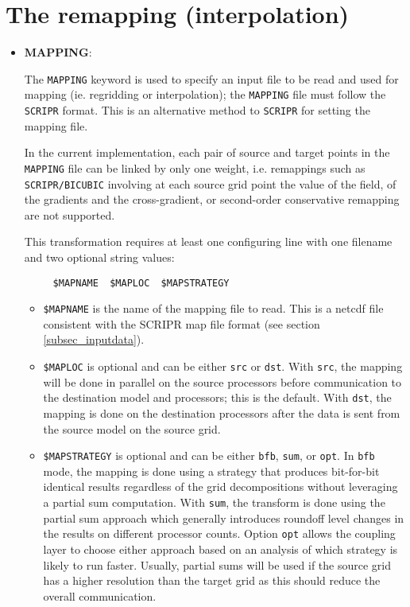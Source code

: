 
\section{The remapping (interpolation)}
\label{subsec_interp}

\begin{itemize}

\item {\bf MAPPING}: 

  The {\tt MAPPING} keyword is used to specify an input file to be
  read and used for mapping (ie. regridding or interpolation); the {\tt MAPPING} file must follow the {\tt SCRIPR} format. 
  This is an alternative method to {\tt SCRIPR} for setting the mapping file.
 
  In the current implementation, each pair of source and target points in the {\tt MAPPING} file can be linked by only one weight, i.e. remappings such as {\tt SCRIPR/BICUBIC} involving at each source grid point the value of the field, of the gradients and the cross-gradient, or second-order conservative remapping are not supported.   

This transformation requires at least one configuring line with one
filename and two optional string values:
\begin{verbatim}
     $MAPNAME  $MAPLOC  $MAPSTRATEGY
\end{verbatim}
  \begin{itemize}
  \item {\tt \$MAPNAME} is the name of the mapping file to read.  This
    is a netcdf file consistent with the SCRIPR map file format (see section
  \ref{subsec_inputdata}).

  \item {\tt \$MAPLOC} is optional and can be either {\tt src} or {\tt dst}.  With {\tt src}, the mapping will be done
  in parallel on the source processors before communication to the destination model and processors; this is the default.   With {\tt dst}, the mapping is 
  done on the destination processors after the data is sent from the source
  model on the source grid. 

  \item {\tt \$MAPSTRATEGY} is optional and can be either {\tt bfb}, {\tt sum}, or {\tt opt}.  In {\tt bfb} mode, the mapping is
  done using a strategy that produces bit-for-bit identical results regardless
  of the grid decompositions without leveraging a partial sum computation.  With
  {\tt sum}, the transform is done using the partial sum approach which generally
  introduces roundoff level changes in the results on different processor
  counts. Option {\tt opt} allows the coupling layer to choose either
  approach based on an analysis of which strategy is likely to run
  faster. Usually, partial sums will be used if the source grid has a higher resolution
  than the target grid as this should reduce the overall
  communication. 


\end{itemize}
\end{itemize}
